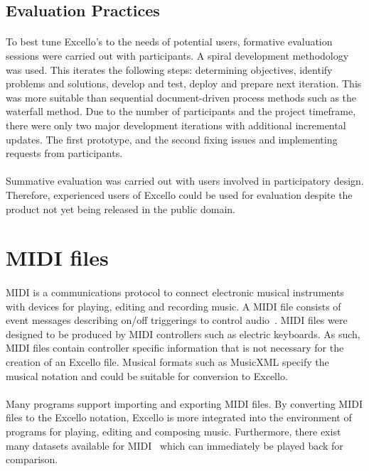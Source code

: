 \subsection{Evaluation Practices}

\paragraph{} To best tune Excello's to the needs of potential users, formative evaluation sessions were carried out with participants. A spiral development methodology~\cite{boehm:spiral} was used. This iterates the following steps: determining objectives, identify problems and solutions, develop and test, deploy and prepare next iteration. This was more suitable than sequential document-driven process methods such as the waterfall method. Due to the number of participants and the project timeframe, there were only two major development iterations with additional incremental updates. The first prototype, and the second fixing issues and implementing requests from participants.

\paragraph{} Summative evaluation was carried out with users involved in participatory design. Therefore, experienced users of Excello could be used for evaluation despite the product not yet being released in the public domain.

\section{MIDI files}

\paragraph{} MIDI is a communications protocol to connect electronic musical instruments with devices for playing, editing and recording music. A MIDI file consists of event messages describing on/off triggerings to control audio~\cite{huber:midimanual}. MIDI files were designed to be produced by MIDI controllers such as electric keyboards. As such, MIDI files contain controller specific information that is not necessary for the creation of an Excello file. Musical formats such as MusicXML specify the musical notation and could be suitable for conversion to Excello.

\paragraph{} Many programs support importing and exporting MIDI files. By converting MIDI files to the Excello notation, Excello is more integrated into the environment of programs for playing, editing and composing music. Furthermore, there exist many datasets available for MIDI~\cite{huang:deep} which can immediately be played back for comparison.
